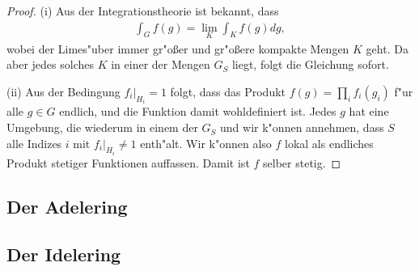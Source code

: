 		\begin{proof}
			(i) Aus der Integrationstheorie ist bekannt, dass
			\begin{align*}
				\int_{G} f(g) = \lim_{K} \int_{K} f(g)dg,
			\end{align*}
			wobei der Limes"uber immer gr"oßer und gr"oßere kompakte Mengen  $K$ geht. Da aber jedes solches $K$ in einer der Mengen $G_S$ liegt, folgt die Gleichung sofort.
			
			(ii) Aus der Bedingung $f_i |_{H_i} = 1$ folgt, dass das Produkt $f(g) = \prod_{i}f_{i}(g_i)$ f"ur alle $g \in G$ endlich, und die Funktion damit wohldefiniert ist. Jedes $g$ hat eine Umgebung, die wiederum in einem der $G_S$ und wir k"onnen annehmen, dass $S$ alle Indizes $i$ mit $f_i|_{H_i}\not= 1$ enth"alt. %
			Wir k"onnen also $f$ lokal als endliches Produkt stetiger Funktionen auffassen. Damit ist $f$ selber stetig.
		\end{proof}
	\subsection{Der Adelering}
	\subsection{Der Idelering}
	